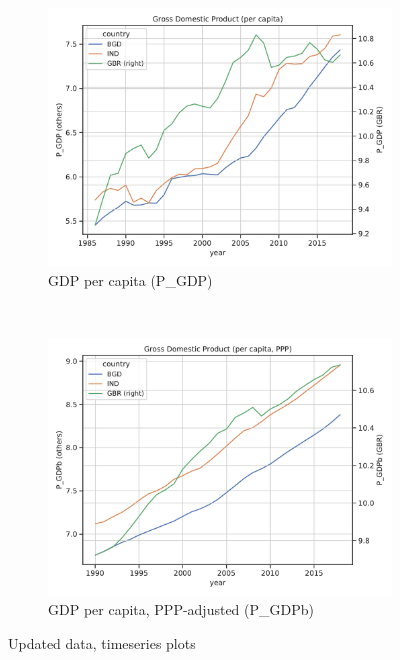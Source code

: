 \documentclass[11pt,a4paper]{article}
\begin{document}
\begin{figure}[htbp]\ContinuedFloat
\centering
\begin{subfigure}{0.9\textwidth}
\includegraphics[width=\textwidth]{./plots/P_GDP_timeseries.pdf}
\caption{GDP per capita (P\_GDP)}
\end{subfigure}\\
\begin{subfigure}{0.9\textwidth}
\includegraphics[width=\textwidth]{./plots/P_GDPb_timeseries.pdf}
\caption{GDP per capita, PPP-adjusted (P\_GDPb)}
\end{subfigure}
\caption{Updated data, timeseries plots}
\label{fig:data_plots}
\end{figure}
\end{document}

